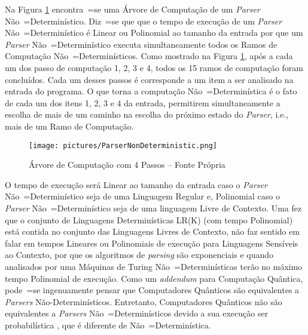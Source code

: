 {    Na Figura \ref{fig:pictures/ParserNonDeterministic.png} encontra~=se uma
    Árvore de Computação de um \textit{Parser} Não~=Determinístico.
    Diz~=se que que o tempo de execução de um \textit{Parser} Não~=Determinístico é Linear ou
    Polinomial ao tamanho da entrada por que um \textit{Parser} Não~=Determinístico
    executa simultaneamente todos os Ramos de Computação Não~=Determinísticos.
    Como mostrado na Figura \ref{fig:pictures/ParserNonDeterministic.png},
    após a cada um dos passo de computação 1,
    2, 3 e 4,
    todos os 15 ramos de computação foram concluídos.
    Cada um desses passos é corresponde a um item a ser analisado na entrada do programa.
    O que torna a computação Não~=Determinística é o fato de cada um dos itens 1,
    2, 3 e 4 da entrada,
    permitirem simultaneamente a escolha de mais de um caminho
    na escolha do próximo estado do \textit{Parser},
    i.e.,
    mais de um Ramo de Computação.
    \begin{figure}[H]
    \centering
    \texttt{[image: pictures/ParserNonDeterministic.png]}
    \caption{Árvore de Computação com 4 Passos -- Fonte Própria}
    \label{fig:pictures/ParserNonDeterministic.png}
    \end{figure}

    O tempo de execução será Linear ao tamanho da entrada caso o
    \textit{Parser} Não~=Determinístico seja de uma Linguagem Regular e,
    Polinomial caso o \textit{Parser} Não~=Determinístico seja de uma linguagem Livre de Contexto.
    Uma fez que o conjunto de Linguagens Determinísticas LR(K) (com tempo
    Polinomial) está contida no conjunto das Linguagens Livres de Contexto,
    não faz sentido em falar em tempos Lineares ou Polinomiais
    de execução para Linguagens Sensíveis ao Contexto,
    por que os algoritmos de \textit{parsing} são exponenciais e
    quando analisados por uma Máquinas de Turing Não~=Determinísticas
    terão no máximo tempo Polinomial de execução.
    Como um \textit{addendum} para Computação Quântica,
    pode~=se ingenuamente pensar que Computadores Quânticos são
    equivalentes a \textit{Parsers} Não-Determinísticos.
    Entretanto,
    Computadores Quânticos não são equivalentes a \textit{Parsers}
    Não~=Determinísticos devido a sua execução ser probabilística
    \cite{polynomialQuantumComputers},
    que é diferente de Não~=Determinística.

}
